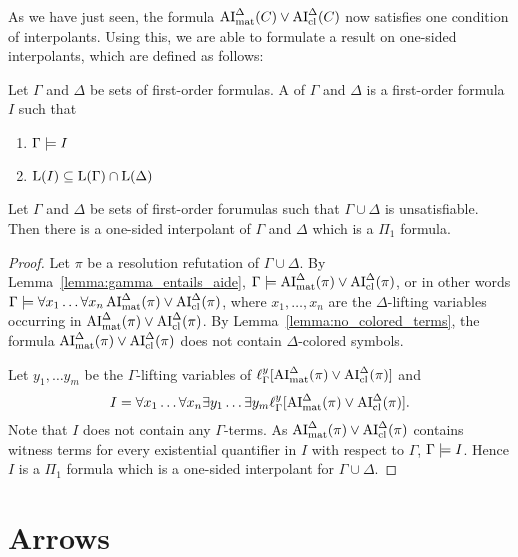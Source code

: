 \documentclass[,%
	draft=false,%
	numbers=noendperiod
	11pt,
	a4paper,
	oneside,%
	openany,
]{memoir}
\begin{document}
As we have just seen, the formula $\operatorname{AI}_\mathrm{mat}^\Delta(C) \lor \operatorname{AI}_\mathrm{cl}^\Delta(C)$ now satisfies one condition of interpolants.
Using this, we are able to formulate a result on one-sided interpolants, which are defined as follows:

\begin{defi}
	Let $\Gamma$ and $\Delta$ be sets of first-order formulas.
	A  of $\Gamma$ and $\Delta$ is a first-order formula $I$ such that
	\begin{enumerate}
		\item $\Gamma \models I$
		\item $\operatorname{L}(I) \subseteq \operatorname{L}(\Gamma) \cap \operatorname{L}(\Delta)$
			\qedhere
	\end{enumerate}
\end{defi}

\begin{prop}
	Let $\Gamma$ and $\Delta$ be sets of first-order forumulas such that $\Gamma\cup\Delta$ is unsatisfiable.
	Then there is a one-sided interpolant of $\Gamma$ and $\Delta$ which is a $\Pi_1$ formula.
\end{prop}
\begin{proof}
	Let $\pi$ be a resolution refutation of $\Gamma\cup\Delta$.
	By Lemma~\ref{lemma:gamma_entails_aide}, $\Gamma \models \operatorname{AI}_\mathrm{mat}^\Delta(\pi) \lor \operatorname{AI}_\mathrm{cl}^\Delta(\pi)$,
	or in other words
	$\Gamma \models \forall x_1 \dots \forall x_n  \operatorname{AI}_\mathrm{mat}^\Delta(\pi) \lor \operatorname{AI}_\mathrm{cl}^\Delta(\pi)$, where $x_1, \dots, x_n$ are the $\Delta$-lifting variables occurring in $\operatorname{AI}_\mathrm{mat}^\Delta(\pi) \lor \operatorname{AI}_\mathrm{cl}^\Delta(\pi)$.
	By Lemma~\ref{lemma:no_colored_terms}, the formula $\operatorname{AI}_\mathrm{mat}^\Delta(\pi) \lor \operatorname{AI}_\mathrm{cl}^\Delta(\pi)$ does not contain $\Delta$-colored symbols.

	Let $y_1, \dots y_m$ be the $\Gamma$-lifting variables of $\ell_{\Gamma}^{y}[\operatorname{AI}_\mathrm{mat}^\Delta(\pi) \lor \operatorname{AI}_\mathrm{cl}^\Delta(\pi)]$
	and
	\[I = \forall x_1 \dots \forall x_n \exists y_1 \dots \exists y_m \ell_{\Gamma}^{y}[\operatorname{AI}_\mathrm{mat}^\Delta(\pi) \lor \operatorname{AI}_\mathrm{cl}^\Delta(\pi)].\]
	Note that $I$ does not contain any $\Gamma$-terms.
	As $\operatorname{AI}_\mathrm{mat}^\Delta(\pi) \lor \operatorname{AI}_\mathrm{cl}^\Delta(\pi)$ contains witness terms for every existential quantifier in $I$ with respect to $\Gamma$, $\Gamma \models I$.
	Hence $I$ is a $\Pi_1$ formula which is a one-sided interpolant for $\Gamma \cup \Delta$.
\end{proof}


\section{Arrows}
\end{document}
